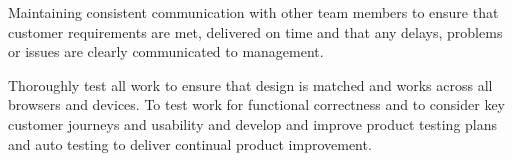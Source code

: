 \begin{zitemize}
\item Maintaining consistent communication with other team members to ensure that customer requirements are met, delivered on time and that any delays, problems or issues are clearly communicated to management.
\item Thoroughly test all work to ensure that design is matched and works across all browsers and devices. To test work for functional correctness and to consider key customer journeys and usability and develop and improve product testing plans and auto testing to deliver continual product improvement.
\end{zitemize}
 